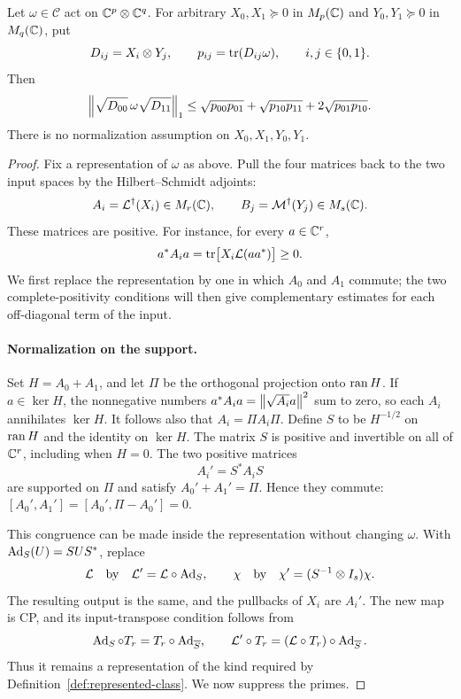 \begin{lemma}\label{lem:coherence}
Let $\omega\in\mathscr C$ act on $\mathbb C^p\otimes\mathbb C^q$.  For arbitrary
$X_0,X_1\succeq0$ in $M_{p}(\mathbb C)$ and $Y_0,Y_1\succeq0$ in $M_{q}(\mathbb C)$, put
\[
 D_{ij}=X_i\otimes Y_j,
 \qquad p_{ij}=\operatorname{tr}(D_{ij}\omega),
 \qquad i,j\in\{0,1\}.
\]
Then
\begin{equation}\label{eq:coherence}
 \left\lVert\sqrt{D_{00}}\,\omega\sqrt{D_{11}}\right\rVert_1
 \le \sqrt{p_{00}p_{01}}+\sqrt{p_{10}p_{11}}
       +2\sqrt{p_{01}p_{10}}.
\end{equation}
There is no normalization assumption on $X_0,X_1,Y_0,Y_1$.
\end{lemma}

\begin{proof}
Fix a representation of $\omega$ as above.  Pull the four matrices back
to the two input spaces by the Hilbert--Schmidt adjoints:
\[
 A_i=\mathcal L^\dagger(X_i)\in M_{r}(\mathbb C),
 \qquad B_j=\mathcal M^\dagger(Y_j)\in M_{s}(\mathbb C).
\]
These matrices are positive.  For instance, for every $a\in\mathbb C^r$,
\[
 a^*A_i a=\operatorname{tr}\bigl[X_i\mathcal L(aa^*)\bigr]\ge0.
\]
We first replace the representation by one in which $A_0$ and $A_1$ commute;
the two complete-positivity conditions will then give complementary
estimates for each off-diagonal term of the input.

\paragraph{Normalization on the support.}
Set $H=A_0+A_1$, and let $\Pi$ be the orthogonal projection onto
$\operatorname{ran} H$.  If $a\in\ker H$, the nonnegative numbers
$a^*A_i a=\left\lVert\sqrt{A_i}a\right\rVert^2$ sum to zero, so each $A_i$ annihilates
$\ker H$.  It follows also that $A_i=\Pi A_i\Pi$.
Define $S$ to be $H^{-1/2}$ on $\operatorname{ran} H$ and the identity on $\ker H$.
The matrix $S$ is positive and invertible on all of $\mathbb C^r$, including
when $H=0$.  The two positive matrices
\[
 A_i'=S^*A_iS
\]
are supported on $\Pi$ and satisfy $A_0'+A_1'=\Pi$.  Hence they commute:
$[A_0',A_1']=[A_0',\Pi-A_0']=0$.

This congruence can be made inside the representation without changing
$\omega$.  With $\operatorname{Ad}_S(U)=SUS^*$, replace
\[
 \mathcal L\quad\hbox{by}\quad\mathcal L'=
 \mathcal L\circ\operatorname{Ad}_S,
 \qquad
 \chi\quad\hbox{by}\quad\chi'=(S^{-1}\otimes I_s)\chi.
\]
The resulting output is the same, and the pullbacks of $X_i$ are $A_i'$.
The new map is CP, and its input-transpose condition follows from
\[
 \operatorname{Ad}_S\circ T_r=T_r\circ\operatorname{Ad}_{\overline S},
 \qquad
 \mathcal L'\circ T_r=(\mathcal L\circ T_r)
                         \circ\operatorname{Ad}_{\overline S}.
\]
Thus it remains a representation of the kind required by
Definition~\ref{def:represented-class}.  We now suppress the primes.


\end{proof}
